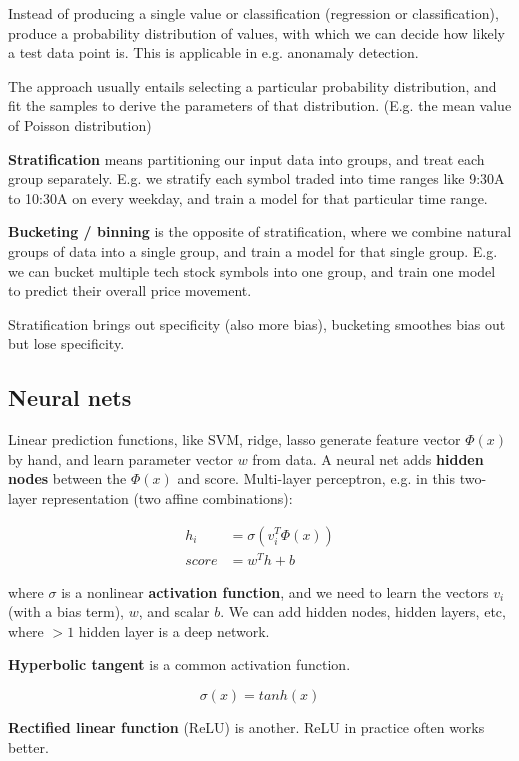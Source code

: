 \documentclass{article}
\begin{document}
Instead of producing a single value or classification (regression or classification), produce a probability distribution of values, with which we can decide how likely a test data point is.
This is applicable in e.g. anonamaly detection.

The approach usually entails selecting a particular probability distribution, and fit the samples to derive the parameters of that distribution. (E.g. the mean value of Poisson distribution)

\textbf{Stratification} means partitioning our input data into groups, and treat each group separately.
E.g. we stratify each symbol traded into time ranges like 9:30A to 10:30A on every weekday, and train a model for that particular time range.

\textbf{Bucketing / binning} is the opposite of stratification, where we combine natural groups of data into a single group, and train a model for that single group.
E.g. we can bucket multiple tech stock symbols into one group, and train one model to predict their overall price movement.

Stratification brings out specificity (also more bias), bucketing smoothes bias out but lose specificity.


\subsection{Neural nets}

Linear prediction functions, like SVM, ridge, lasso generate feature vector $\Phi(x)$ by hand, and learn parameter vector $w$ from data.
A neural net adds \textbf{hidden nodes} between the $\Phi(x)$ and score.
Multi-layer perceptron, e.g. in this two-layer representation (two affine combinations):

\begin{align*}
h_i   &= \sigma(v_i^T \Phi(x)) \\
score &= w^T h + b
\end{align*}

where $\sigma$ is a nonlinear \textbf{activation function}, and we need to learn the vectors $v_i$ (with a bias term), $w$, and scalar $b$.
We can add hidden nodes, hidden layers, etc, where $>1$ hidden layer is a deep network.

\textbf{Hyperbolic tangent} is a common activation function.

$$
\sigma(x) = tanh(x)
$$

\textbf{Rectified linear function} (ReLU) is another. ReLU in practice often works better.
\end{document}
